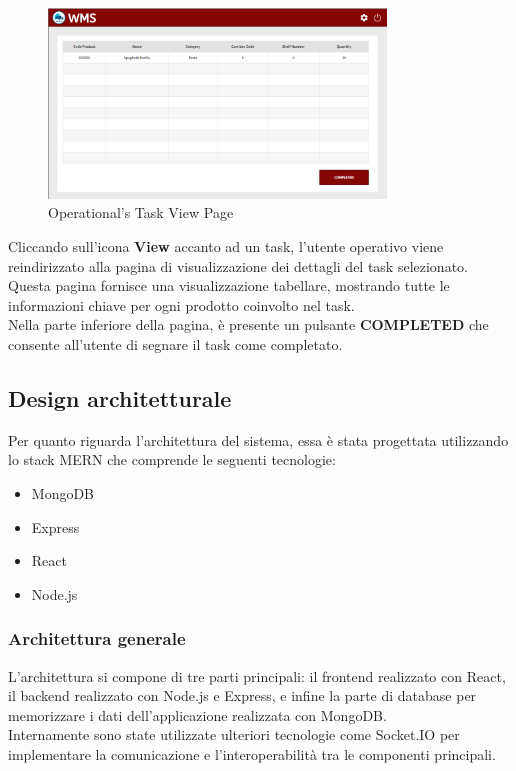 \begin{figure}[H]
    \centering
    \includegraphics[width=0.8\textwidth]{document/sections/img/taskPageOp.png}
    \caption{Operational's Task View Page}
    \label{fig:taskPageOp}
\end{figure}
Cliccando sull'icona \textbf{View} accanto ad un task, l'utente operativo viene reindirizzato alla pagina di
visualizzazione dei dettagli del task selezionato.\\
Questa pagina fornisce una visualizzazione tabellare, mostrando tutte le informazioni chiave per ogni prodotto
coinvolto nel task.\\
Nella parte inferiore della pagina, è presente un pulsante \textbf{COMPLETED} che consente all'utente di
segnare il task come completato.


\subsection{Design architetturale}
Per quanto riguarda l'architettura del sistema, essa è stata progettata utilizzando lo stack MERN che
comprende le seguenti tecnologie:
\begin{itemize}
    \item MongoDB
    \item Express
    \item React
    \item Node.js
\end{itemize}
\subsubsection{Architettura generale}

L'architettura si compone di tre parti principali: il frontend realizzato con React\cite{react}, il backend
realizzato con Node.js e Express, e infine la parte di database per memorizzare i dati dell'applicazione
realizzata con MongoDB.\\ Internamente sono state utilizzate ulteriori tecnologie come Socket.IO
per implementare la comunicazione e l'interoperabilità tra le componenti principali.

